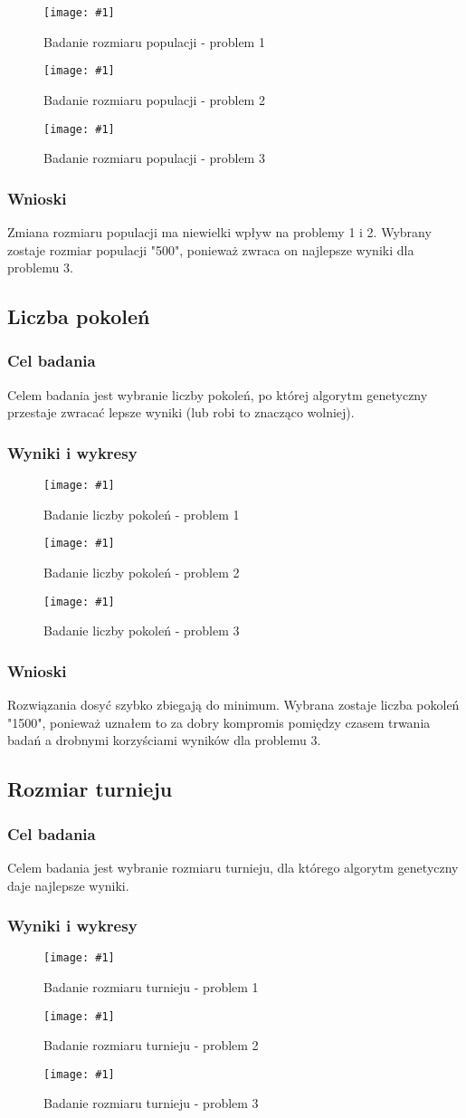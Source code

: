 \documentclass[12pt,a4paper]{article}
\newcommand{\image}[2] {
    \begin{figure}[H]
        \begin{center}
            \texttt{[image: \#1]}
        \end{center}
        \caption{#2}
        \label{#1}
    \end{figure}
}
\begin{document}
\image{images/Badanie rozmiaru populacji_1}{Badanie rozmiaru populacji - problem 1}
\image{images/Badanie rozmiaru populacji_2}{Badanie rozmiaru populacji - problem 2}
\image{images/Badanie rozmiaru populacji_3}{Badanie rozmiaru populacji - problem 3}
\subsubsection{Wnioski}
Zmiana rozmiaru populacji ma niewielki wpływ na problemy 1 i 2.
Wybrany zostaje rozmiar populacji "500", ponieważ zwraca on najlepsze wyniki dla problemu 3.

\subsection{Liczba pokoleń}
\subsubsection{Cel badania}
Celem badania jest wybranie liczby pokoleń, po której algorytm genetyczny przestaje zwracać lepsze wyniki (lub robi to znacząco wolniej).
\subsubsection{Wyniki i wykresy}
\image{images/Badanie liczby generacji_1}{Badanie liczby pokoleń - problem 1}
\image{images/Badanie liczby generacji_2}{Badanie liczby pokoleń - problem 2}
\image{images/Badanie liczby generacji_3}{Badanie liczby pokoleń - problem 3}
\subsubsection{Wnioski}
Rozwiązania dosyć szybko zbiegają do minimum.
Wybrana zostaje liczba pokoleń "1500", ponieważ uznałem to za dobry kompromis pomiędzy czasem trwania badań a drobnymi korzyściami wyników dla problemu 3.

\subsection{Rozmiar turnieju}
\subsubsection{Cel badania}
Celem badania jest wybranie rozmiaru turnieju, dla którego algorytm genetyczny daje najlepsze wyniki.
\subsubsection{Wyniki i wykresy}
\image{images/Badanie rozmiaru turnieju_1}{Badanie rozmiaru turnieju - problem 1}
\image{images/Badanie rozmiaru turnieju_2}{Badanie rozmiaru turnieju - problem 2}
\image{images/Badanie rozmiaru turnieju_3}{Badanie rozmiaru turnieju - problem 3}
\end{document}
